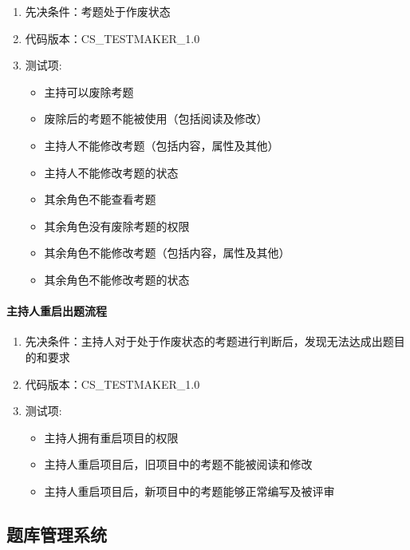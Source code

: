\documentclass[hyperref, a4paper]{ctexart}
\providecommand{\tightlist}{%
  \setlength{\itemsep}{0pt}\setlength{\parskip}{0pt}}
\let\oldparagraph\paragraph
\renewcommand{\paragraph}[1]{\oldparagraph{#1}\mbox{}}
\begin{document}
\begin{enumerate}
\def\labelenumi{\arabic{enumi}.}
\tightlist
\item
  先决条件：考题处于作废状态
\item
  代码版本：CS\_TESTMAKER\_1.0
\item
  测试项:

  \begin{itemize}
  \tightlist
  \item
    主持可以废除考题
  \item
    废除后的考题不能被使用（包括阅读及修改）
  \item
    主持人不能修改考题（包括内容，属性及其他）
  \item
    主持人不能修改考题的状态
  \item
    其余角色不能查看考题
  \item
    其余角色没有废除考题的权限
  \item
    其余角色不能修改考题（包括内容，属性及其他）
  \item
    其余角色不能修改考题的状态
  \end{itemize}
\end{enumerate}

\hypertarget{ux4e3bux6301ux4ebaux91cdux542fux51faux9898ux6d41ux7a0b}{%
\paragraph{主持人重启出题流程}\label{ux4e3bux6301ux4ebaux91cdux542fux51faux9898ux6d41ux7a0b}}

\begin{enumerate}
\def\labelenumi{\arabic{enumi}.}
\tightlist
\item
  先决条件：主持人对于处于作废状态的考题进行判断后，发现无法达成出题目的和要求
\item
  代码版本：CS\_TESTMAKER\_1.0
\item
  测试项:

  \begin{itemize}
  \tightlist
  \item
    主持人拥有重启项目的权限
  \item
    主持人重启项目后，旧项目中的考题不能被阅读和修改
  \item
    主持人重启项目后，新项目中的考题能够正常编写及被评审
  \end{itemize}
\end{enumerate}

\hypertarget{ux9898ux5e93ux7ba1ux7406ux7cfbux7edf}{%
\subsection{题库管理系统}\label{ux9898ux5e93ux7ba1ux7406ux7cfbux7edf}}
\end{document}
